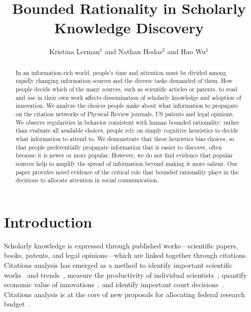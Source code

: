 \documentclass[10pt]{bmc_article}
\newenvironment{bmcformat}{\baselineskip20pt\sloppy\setboolean{publ}{false}}{\baselineskip20pt\sloppy}
\begin{document}
\begin{bmcformat}


\title{Bounded Rationality in Scholarly Knowledge Discovery}

\author{Kristina Lerman$^1$\correspondingauthor
       and
         Nathan Hodas$^2$
       and
       Hao Wu$^1$
      }
\address{%
    \iid(1) USC Information Sciences Institute,  Marina del Rey, CA, USA \\
    \iid(2) Pacific Northwest National Laboratory, Richland, WA, USA
}%

\maketitle

\begin{abstract}
In an information-rich world, people's time and attention must be divided among rapidly changing information sources and the diverse tasks demanded of them.
How people decide which of the many sources, such as scientific articles or patents, to read and use in their own work affects dissemination of scholarly knowledge and adoption of innovation.
We analyze the choices people make about what information to propagate on the citation networks of Physical Review journals, US patents and legal opinions.
We observe regularities in behavior consistent with human bounded rationality: rather than evaluate all available choices, people rely on simply cognitive heuristics to decide what information to attend to. %
We demonstrate that these heuristics bias choices, so that people preferentially propagate information that is easier to discover, often because it is newer or more popular.
However, we do not find evidence that popular sources help to amplify the spread of information beyond making it more salient.
Our paper provides novel evidence of the critical role that bounded rationality plays in the decisions to allocate attention in social communication.
\end{abstract}


\section{Introduction}
Scholarly knowledge is expressed through published works---scientific papers, books, patents, and legal opinions---which are linked together through citations. Citations analysis has emerged as a method to identify important scientific works~\cite{Redner05,chen07} and trends~\cite{Borner04,Rosvall08,Mazloumian11}, measure the productivity of individual scientists~\cite{hindex,Radicchi09}, quantify economic value of innovations~\cite{patent-value,patents}, and identify important court decisions~\cite{Fowler07,Neale13}. Citations analysis is at the core of new proposals for allocating federal research budget~\cite{Bollen13}.


\end{bmcformat}
\end{document}
